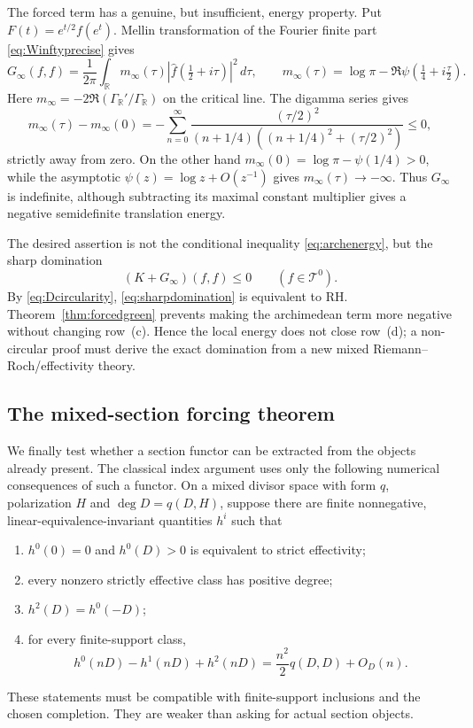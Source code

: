 \documentclass[11pt]{amsart}
\theoremstyle{definition}
\theoremstyle{remark}
\newcommand{\RH}{\mathrm{RH}}
\begin{document}
The forced term has a genuine, but insufficient, energy property.  Put
$F(t)=e^{t/2}f(e^t)$.  Mellin transformation of the Fourier finite part
\eqref{eq:Winftyprecise} gives
\begin{equation}\label{eq:archmultiplier}
 G_\infty(f,f)=\frac1{2\pi}\int_{\mathbb R}m_\infty(\tau)
 |\widehat f(\tfrac12+i\tau)|^2\,d\tau,\qquad
 m_\infty(\tau)=\log\pi-\Re\psi(\tfrac14+i\tfrac\tau2).
\end{equation}
Here $m_\infty=-2\Re(\Gamma_{\mathbb R}'/\Gamma_{\mathbb R})$ on the
critical line.  The digamma series gives
\begin{equation}\label{eq:archenergy}
 m_\infty(\tau)-m_\infty(0)
 =-\sum_{n=0}^\infty
 \frac{(\tau/2)^2}
 {(n+1/4)((n+1/4)^2+(\tau/2)^2)}\le0,
\end{equation}
strictly away from zero.  On the other hand
$m_\infty(0)=\log\pi-\psi(1/4)>0$, while the asymptotic
$\psi(z)=\log z+O(z^{-1})$ gives $m_\infty(\tau)\to-\infty$.
Thus $G_\infty$ is indefinite, although subtracting its maximal constant
multiplier gives a negative semidefinite translation energy.

The desired assertion is not the conditional inequality
\eqref{eq:archenergy}, but the sharp domination
\begin{equation}\label{eq:sharpdomination}
 (K+G_\infty)(f,f)\le0\qquad(f\in\mathcal T^0).
\end{equation}
By \eqref{eq:Dcircularity}, \eqref{eq:sharpdomination} is equivalent to
$\RH$.  Theorem~\ref{thm:forcedgreen} prevents making the archimedean term
more negative without changing row~(c).  Hence the local energy does not
close row~(d); a non-circular proof must derive the exact domination from a
new mixed Riemann--Roch/effectivity theory.

\subsection{The mixed-section forcing theorem}

We finally test whether a section functor can be extracted from the objects
already present.  The classical index argument uses only the following
numerical consequences of such a functor.  On a mixed divisor space with
form $q$, polarization $H$ and $\deg D=q(D,H)$, suppose there are finite
nonnegative, linear-equivalence-invariant quantities $h^i$ such that
\begin{enumerate}
\item $h^0(0)=0$ and $h^0(D)>0$ is equivalent to strict effectivity;
\item every nonzero strictly effective class has positive degree;
\item $h^2(D)=h^0(-D)$;
\item for every finite-support class,
\begin{equation}\label{eq:mixedRRminimum}
 h^0(nD)-h^1(nD)+h^2(nD)
 =\frac{n^2}{2}q(D,D)+O_D(n).
\end{equation}
\end{enumerate}
These statements must be compatible with finite-support inclusions and the
chosen completion.  They are weaker than asking for actual section objects.
\end{document}
